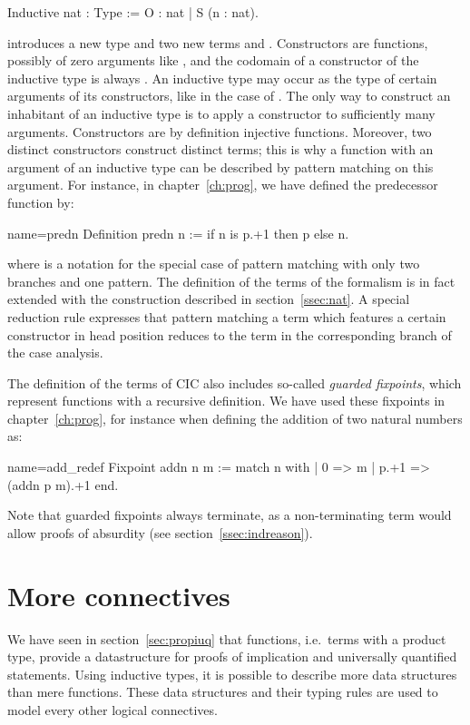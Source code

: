 \begin{coq}{}{}
Inductive nat : Type := O : nat | S (n : nat).
\end{coq}
introduces a new type  and two new terms  and
. Constructors are functions, possibly of zero
arguments like , and the codomain of a constructor of the
inductive type  is always . An inductive type may occur as
the type of certain arguments of its constructors, like in the case of
. The only way to construct an inhabitant of an
inductive type is to apply a constructor to sufficiently many
arguments. Constructors are by definition injective functions.
Moreover, two distinct constructors construct distinct
terms; this is why a function with an argument of an inductive type can be
described by pattern matching on this argument. For instance, in
chapter~\ref{ch:prog}, we have defined the predecessor function by:

\begin{coq}{name=predn}{}
Definition predn n := if n is p.+1 then p else n.
\end{coq}
where  is a notation for the special case of
pattern matching with only two branches and one pattern. The definition of
the terms of the formalism is in fact extended with the
 construction described in
section~\ref{ssec:nat}. A special reduction rule expresses that
pattern matching a term which features a certain constructor in head
position reduces to the term in the corresponding branch of the case
analysis.

The definition of the terms of CIC also includes so-called
\emph{guarded fixpoints}, which represent functions with a recursive
definition. We have used these fixpoints in chapter~\ref{ch:prog}, for
instance when defining the addition of two natural numbers as:

\begin{coq}{name=add_redef}{}
Fixpoint addn n m :=
  match n with
  | 0 => m
  | p.+1 => (addn p m).+1
  end.
\end{coq}
Note that guarded fixpoints always terminate, as a non-terminating
term would allow proofs of absurdity (see section~\ref{ssec:indreason}).

\section{More connectives}\label{sec:moreconns}
We have seen in section~\ref{sec:propiuq} that functions, i.e.~terms
with a product type, provide a datastructure for proofs of implication
and universally quantified statements.
Using inductive types, it is possible to describe more data
structures than mere functions. %
These data structures and their
typing rules are used to model every other logical connectives.

